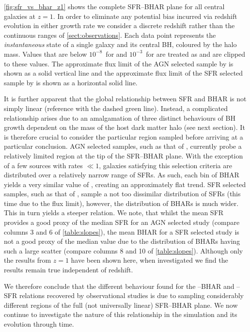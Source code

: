 \cref{fig:sfr_vs_bhar_z1} shows the complete SFR--BHAR plane for all central
galaxies at $z=1$. In order to eliminate any potential bias incurred via
redshift evolution in either growth rate we consider a discrete redshift rather
than the continuous ranges of \cref{sect:observations}. Each data point
represents the \textit{instantaneous} state of a single galaxy and its central
BH, coloured by the halo mass.  Values that are below $10^{-8}$~\Msolyr for
\BHAR and $10^{-3}$~\Msolyr for \SFR are treated as  and are
clipped to these values. The approximate flux limit of the AGN selected sample
by \citet{Stanley2015} is shown as a solid vertical line and the approximate
flux limit of the SFR selected sample by \citet{Delvecchio2015} is shown as a
horizontal solid line.

It is further apparent that the global relationship between SFR and BHAR is not
simply linear (reference with the dashed green line). Instead, a complicated
relationship arises due to an amalgamation of three distinct behaviours of BH
growth dependent on the mass of the host dark matter halo (see next section).
It is therefore crucial to consider the particular region sampled before
arriving at a particular conclusion.  AGN selected samples, such as that of
\citet{Stanley2015}, currently probe a relatively limited region at the tip of
the SFR--BHAR plane.  With the exception of a few sources with rates \SFR $\ll
1$\Msolyr, galaxies satisfying this selection criteria are distributed over a
relatively narrow range of SFRs. As such, each bin of BHAR yields a very
similar value of , creating an approximately flat trend.  SFR selected
samples, such as that of \citet{Delvecchio2015}, sample a not too dissimilar
distribution of SFRs (this time due to the flux limit), however, the
distribution of BHARs is much wider.  This in turn yields a steeper relation.
We note, that whilst the mean SFR provides a good proxy of the median SFR for
an AGN selected study (compare columns 3 and 6 of \cref{table:slopes}), the
mean BHAR for a SFR selected study is not a good proxy of the median value due
to the distribution of BHARs having such a large scatter (compare columns 8 and
10 of \cref{table:slopes}).  Although only the results from $z=1$ have been
shown here, when investigated we find the results remain true independent of
redshift.

We therefore conclude that the different behaviour found for the --BHAR
and --SFR relations recovered by observational studies is due to
sampling considerably different regions of the full (not universally linear)
SFR--BHAR plane. We now continue to investigate the nature of this relationship
in the \eagle simulation and its evolution through time.

